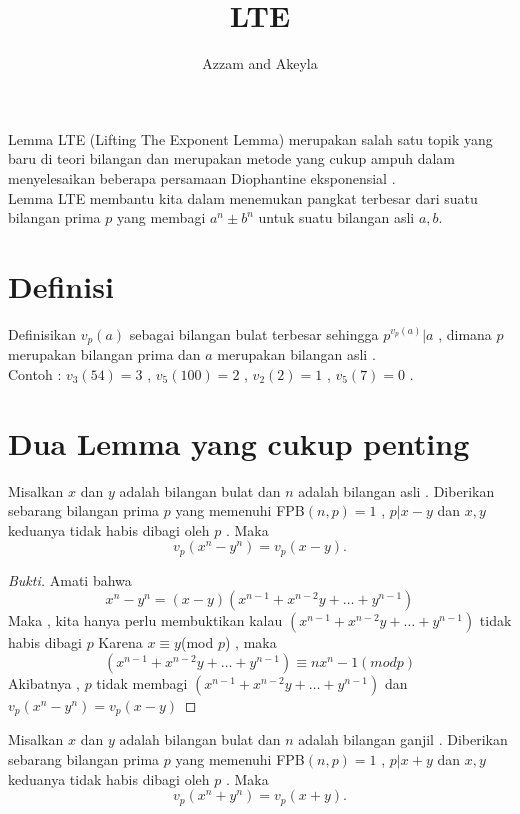 \documentclass{article}
\title{LTE}
\author{Azzam and Akeyla}
\begin{document}
\maketitle

\renewcommand*\contentsname{Daftar Isi}
\tableofcontents

\newpage
\begin{center}
    Lemma LTE (Lifting The Exponent Lemma) merupakan salah satu topik yang baru di teori bilangan dan merupakan metode yang cukup ampuh dalam menyelesaikan beberapa persamaan Diophantine eksponensial . \\
    Lemma LTE membantu kita dalam menemukan pangkat terbesar dari suatu bilangan prima $p$ yang membagi $a^n\pm b^n$ untuk suatu bilangan asli $a,b.$
\end{center}

\section{Definisi}
Definisikan $v_p(a)$ sebagai bilangan bulat terbesar sehingga $p^{v_p(a)}|a$ , dimana $p$ merupakan bilangan prima dan $a$ merupakan bilangan asli .
\\ Contoh : $v_3(54)=3$ , $v_5(100)=2$ , $v_2(2)=1$ , $v_5(7)=0$ .

\section{Dua Lemma yang cukup penting}

\begin{lemma}
Misalkan $x$ dan $y$ adalah bilangan bulat dan $n$ adalah bilangan asli . Diberikan sebarang bilangan prima $p$ yang memenuhi FPB$(n,p)=1$ , $p|x-y$ dan $x,y$ keduanya tidak habis dibagi oleh $p$ . Maka $$v_p(x^n-y^n)=v_p(x-y).$$
\end{lemma}
\begin{proof}[Bukti]
Amati bahwa $$x^n-y^n=(x-y)(x^{n-1}+x^{n-2}y+\dots +y^{n-1})$$
Maka , kita hanya perlu membuktikan kalau $(x^{n-1}+x^{n-2}y+\dots +y^{n-1})$ tidak habis dibagi $p$
Karena $x\equiv y$(mod $p$) , maka $$(x^{n-1}+x^{n-2}y+\dots +y^{n-1}) \equiv nx^n-1(mod p)$$
Akibatnya , $p$ tidak membagi $(x^{n-1}+x^{n-2}y+\dots +y^{n-1})$
dan $v_p(x^n-y^n)=v_p(x-y)$
\end{proof}

\begin{lemma}
Misalkan $x$ dan $y$ adalah bilangan bulat dan $n$ adalah bilangan ganjil . Diberikan sebarang bilangan prima $p$ yang memenuhi FPB$(n,p)=1$ , $p|x+y$ dan $x,y$ keduanya tidak habis dibagi oleh $p$ . Maka $$v_p(x^n+y^n)=v_p(x+y).$$
\end{lemma}
\end{document}
